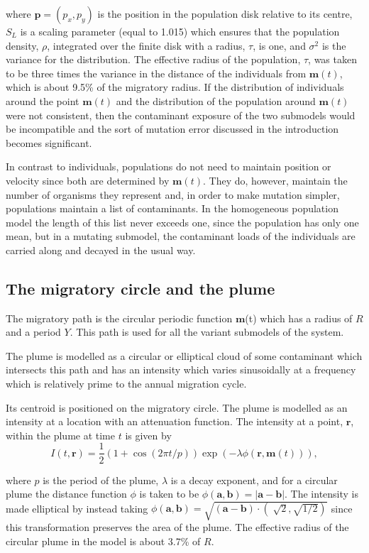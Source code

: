\documentclass{article}
\newcommand{\tmmathbf}[1]{\ensuremath{\boldsymbol{#1}}}
\begin{document}
where $\tmmathbf{p} = (p_x, p_y)$ is the position in the population disk
relative to its centre, $S_L$ is a scaling parameter (equal to 1.015) which
ensures that the population density, $\rho$, integrated over the finite disk
with a radius, $\tau$, is one, and $\sigma^2$ is the variance for the
distribution. The effective radius of the population, $\tau$, was taken to be
three times the variance in the distance of the individuals from $\tmmathbf{m}
(t)$, which is about 9.5\% of the migratory radius. If the distribution of
individuals around the point $\tmmathbf{m} (t)$ and the distribution of the
population around $\tmmathbf{m} (t)$were not consistent, then the contaminant
exposure of the two submodels would be incompatible and the sort of mutation
error discussed in the introduction becomes significant.

In contrast to individuals, populations do not need to maintain position or
velocity since both are determined by $\tmmathbf{m} (t)$. They do, however,
maintain the number of organisms they represent and, in order to make mutation
simpler, populations maintain a list of contaminants. In the homogeneous
population model the length of this list never exceeds one, since the
population has only one mean, but in a mutating submodel, the contaminant
loads of the individuals are carried along and decayed in the usual way.

\subsection{The migratory circle and the plume}

The migratory path is the circular periodic function $\tmmathbf{m}$(t) which
has a radius of $R$ and a period $Y$. This path is used for all the variant
submodels of the system.

The plume is modelled as a circular or elliptical cloud of some contaminant
which intersects this path and has an intensity which varies sinusoidally at a
frequency which is relatively prime to the annual migration cycle.

Its centroid is positioned on the migratory circle. The plume is modelled as
an intensity at a location with an attenuation function. The intensity at a
point, $\tmmathbf{r}$, within the plume at time $t$ is given by
\[ I (t, \tmmathbf{r}) = \frac{1}{2} (1 + \cos (2 \pi t / p)) \exp (- \lambda
   \phi ( \tmmathbf{r}, \tmmathbf{m} (t))), \]


where $p$ is the period of the plume, $\lambda$ is a decay exponent, and for a
circular plume the distance function $\phi$ is taken to be $\phi (
\tmmathbf{a}, \tmmathbf{b}) = | \tmmathbf{a} - \tmmathbf{b} |$. The intensity
is made elliptical by instead taking $\phi ( \tmmathbf{a}, \tmmathbf{b}) =
\sqrt{( \tmmathbf{a} - \tmmathbf{b}) \cdot ( \sqrt[]{2}, \sqrt{1 / 2})}^{}$
since this transformation preserves the area of the plume. The effective
radius of the circular plume in the model is about 3.7\% of $R$.
\end{document}
